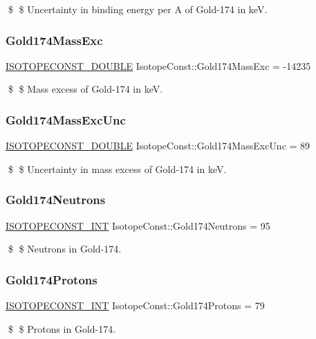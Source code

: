 \$ \$ Uncertainty in binding energy per A of Gold-\/174 in keV. \mbox{\label{group___isotope_const-_gold-_au174_gaee66910d89ba2f9655a827065609aada}} 
\subsubsection{\texorpdfstring{Gold174\+Mass\+Exc}{Gold174MassExc}}
{\footnotesize\ttfamily \mbox{\hyperlink{group___isotope_const-_macros_ga8f45a7272ce02c0b4c65c44636ed719a}{I\+S\+O\+T\+O\+P\+E\+C\+O\+N\+S\+T\+\_\+\+D\+O\+U\+B\+LE}} Isotope\+Const\+::\+Gold174\+Mass\+Exc = -\/14235}

\$ \$ Mass excess of Gold-\/174 in keV. \mbox{\label{group___isotope_const-_gold-_au174_gad8bb95c6bb87e60864a98564ea0b2782}} 
\subsubsection{\texorpdfstring{Gold174\+Mass\+Exc\+Unc}{Gold174MassExcUnc}}
{\footnotesize\ttfamily \mbox{\hyperlink{group___isotope_const-_macros_ga8f45a7272ce02c0b4c65c44636ed719a}{I\+S\+O\+T\+O\+P\+E\+C\+O\+N\+S\+T\+\_\+\+D\+O\+U\+B\+LE}} Isotope\+Const\+::\+Gold174\+Mass\+Exc\+Unc = 89}

\$ \$ Uncertainty in mass excess of Gold-\/174 in keV. \mbox{\label{group___isotope_const-_gold-_au174_gac1ce7bd28beabdd442582b47f16205e3}} 
\subsubsection{\texorpdfstring{Gold174\+Neutrons}{Gold174Neutrons}}
{\footnotesize\ttfamily \mbox{\hyperlink{group___isotope_const-_macros_ga5f18360b3e99483a35c32d789e62621c}{I\+S\+O\+T\+O\+P\+E\+C\+O\+N\+S\+T\+\_\+\+I\+NT}} Isotope\+Const\+::\+Gold174\+Neutrons = 95}

\$ \$ Neutrons in Gold-\/174. \mbox{\label{group___isotope_const-_gold-_au174_gad267fb6573d49a48a0ab21f8a7b635c2}} 
\subsubsection{\texorpdfstring{Gold174\+Protons}{Gold174Protons}}
{\footnotesize\ttfamily \mbox{\hyperlink{group___isotope_const-_macros_ga5f18360b3e99483a35c32d789e62621c}{I\+S\+O\+T\+O\+P\+E\+C\+O\+N\+S\+T\+\_\+\+I\+NT}} Isotope\+Const\+::\+Gold174\+Protons = 79}

\$ \$ Protons in Gold-\/174. 